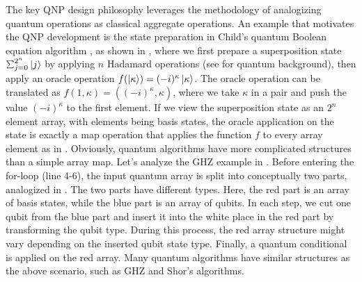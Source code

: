 The key QNP design philosophy leverages the methodology of analogizing quantum operations as classical aggregate operations.
An example that motivates the QNP development is the state preparation in Child's quantum Boolean equation algorithm \cite{ChildsNAND}, as shown in ,
where we first prepare a superposition state $\Msum_{j=0}^{2^n}\ket{j}$ by applying $n$ Hadamard operations (see  for quantum background), then apply an oracle operation $f(\left\vert{\kappa}\right\rangle)=(-i)^{\kappa}\left\vert{\kappa}\right\rangle$.
The oracle operation can be translated as $f(1,\kappa)=((-i)^{\kappa},\kappa)$, where we take $\kappa$ in a pair and push the value $(-i)^{\kappa}$ to the first element.
If we view the superposition state as an $2^n$ element array, with elements being basis states, the oracle application on the state is exactly a map operation that applies the function $f$ to every array element as in .
Obviously, quantum algorithms have more complicated structures than a simple array map.
Let's analyze the GHZ example in . Before entering the for-loop (line 4-6), the input quantum array is split into conceptually two parts, analogized in . 
The two parts have different types. Here, the red part is an array of basis states, while the blue part is an array of qubits.
In each step, we cut one qubit from the blue part and insert it into the white place in the red part by transforming the qubit type.
During this process, the red array structure might vary depending on the inserted qubit state type.
Finally, a quantum conditional is applied on the red array.
Many quantum algorithms have similar structures as the above scenario, such as GHZ \cite{Greenberger1989} and Shor's algorithms. 

